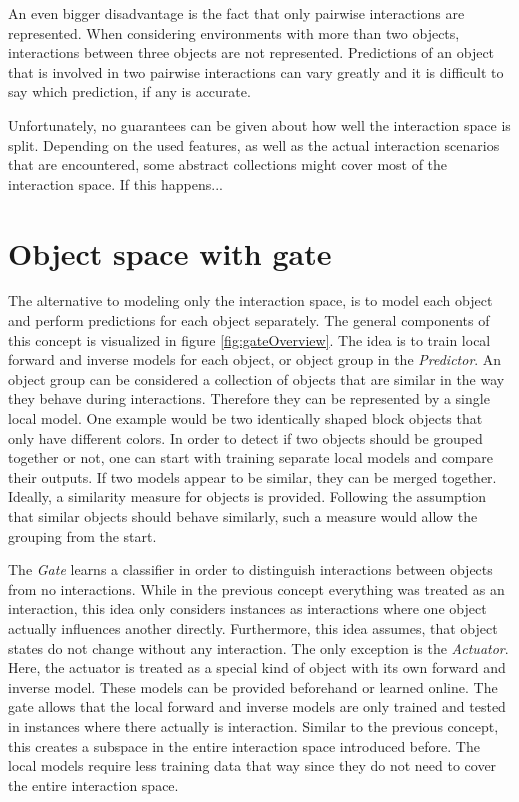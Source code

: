 An even bigger disadvantage is the fact that only pairwise interactions are represented. When considering environments with more than two objects, interactions between three objects are not represented. Predictions of an object that is involved in two pairwise interactions can vary greatly and it is difficult to say which prediction, if any is accurate.

Unfortunately, no guarantees can be given about how well the interaction space is split. Depending on the used features, as well as the actual interaction scenarios that are encountered, some abstract collections might cover most of the interaction space. If this happens... %

\section{Object space with gate \label{sec:gate}}

The alternative to modeling only the interaction space, is to model each object and perform predictions for each object separately. The general components of this concept is visualized in figure \ref{fig:gateOverview}.
The idea is to train local forward and inverse models for each object, or object group in the \textit{Predictor}. %
An object group can be considered a collection of objects that are similar in the way they behave during interactions. Therefore they can be represented by a single local model. One example would be two identically shaped block objects that only have different colors. In order to detect if two objects should be grouped together or not, one can start with training separate local models and compare their outputs. If two models appear to be similar, they can be merged together. Ideally, a similarity measure for objects is provided. Following the assumption that similar objects should behave similarly, such a measure would allow the grouping from the start. 

The \textit{Gate} learns a classifier in order to distinguish interactions between objects from no interactions. While in the previous concept everything was treated as an interaction, this idea only considers instances as interactions where one object actually influences another directly. Furthermore, this idea assumes, that object states do not change without any interaction. The only exception is the \textit{Actuator}. Here, the actuator is treated as a special kind of object with its own forward and inverse model. These models can be provided beforehand or learned online. 
The gate allows that the local forward and inverse models are only trained and tested in instances where there actually is interaction. Similar to the previous concept, this creates a subspace in the entire interaction space introduced before. The local models require less training data that way since they do not need to cover the entire interaction space. 

